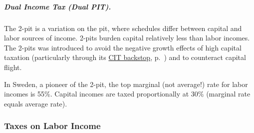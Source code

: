 

\subparagraph{Dual Income Tax (Dual PIT).}
	\label{sec:Dual-PIT}
 The \gls{2-pit} is a variation on the \gls{pit}, where schedules differ between capital and labor sources of income.
\glspl{2-pit} burden capital relatively less than labor incomes.
The \glspl{2-pit} was introduced to avoid the negative growth effects of high capital taxation (particularly through its \hyperref[sec:CIT]{CIT backstop}, p.~\pageref{sec:CIT}) and to counteract capital flight.

In Sweden, a pioneer of the \gls{2-pit}, the top marginal (not average!) rate for labor incomes is 55\%.
Capital incomes are taxed proportionally at 30\% (marginal rate equals average rate).

\subsubsection{Taxes on Labor Income}

